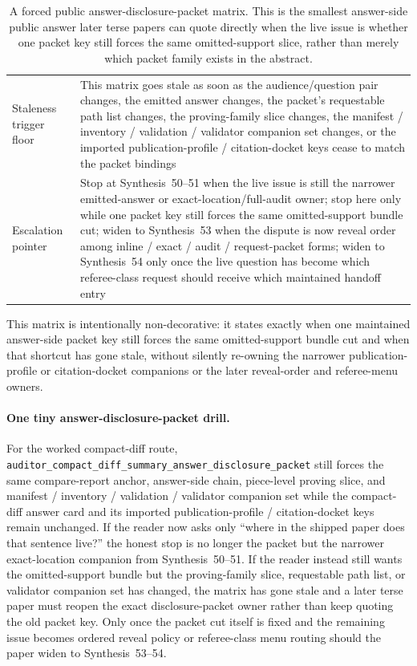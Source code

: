 \documentclass[11pt]{article}
\begin{document}
\begin{table}[t]
\begin{tabularx}{\linewidth}{@{}lX@{}}
Staleness trigger floor & This matrix goes stale as soon as the audience/question pair changes, the emitted answer changes, the packet's requestable path list changes, the proving-family slice changes, the manifest / inventory / validation / validator companion set changes, or the imported publication-profile / citation-docket keys cease to match the packet bindings \\
Escalation pointer & Stop at Synthesis~50--51 when the live issue is still the narrower emitted-answer or exact-location/full-audit owner; stop here only while one packet key still forces the same omitted-support bundle cut; widen to Synthesis~53 when the dispute is now reveal order among inline / exact / audit / request-packet forms; widen to Synthesis~54 only once the live question has become which referee-class request should receive which maintained handoff entry \\
\bottomrule
\end{tabularx}
\caption{A forced public answer-disclosure-packet matrix. This is the smallest answer-side public answer later terse papers can quote directly when the live issue is whether one packet key still forces the same omitted-support slice, rather than merely which packet family exists in the abstract.}
\label{tab:forced-public-answer-disclosure-packet-matrix}
\end{table}

This matrix is intentionally non-decorative: it states exactly when one maintained answer-side packet key still forces the same omitted-support bundle cut and when that shortcut has gone stale, without silently re-owning the narrower publication-profile or citation-docket companions or the later reveal-order and referee-menu owners.\cite{series:workedexample}

\paragraph{One tiny answer-disclosure-packet drill.}
For the worked compact-diff route, \nolinkurl{auditor_compact_diff_summary_answer_disclosure_packet} still forces the same compare-report anchor, answer-side chain, piece-level proving slice, and manifest / inventory / validation / validator companion set while the compact-diff answer card and its imported publication-profile / citation-docket keys remain unchanged. If the reader now asks only ``where in the shipped paper does that sentence live?'' the honest stop is no longer the packet but the narrower exact-location companion from Synthesis~50--51. If the reader instead still wants the omitted-support bundle but the proving-family slice, requestable path list, or validator companion set has changed, the matrix has gone stale and a later terse paper must reopen the exact disclosure-packet owner rather than keep quoting the old packet key. Only once the packet cut itself is fixed and the remaining issue becomes ordered reveal policy or referee-class menu routing should the paper widen to Synthesis~53--54.\cite{series:workedexample}
\end{document}
